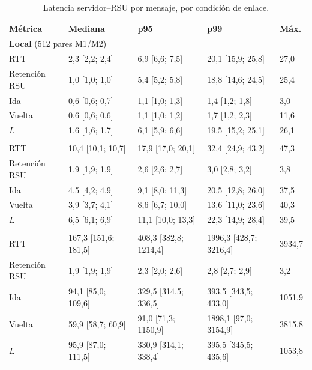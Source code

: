 \begin{table}[H]
\centering
\caption{Latencia servidor--RSU por mensaje, por condición de enlace.}
\label{tab:latencia_mensaje}
\small
\begin{tabular}{lllll}
\toprule
\textbf{Métrica} & \textbf{Mediana} & \textbf{p95} & \textbf{p99} & \textbf{Máx.} \\
\midrule
\multicolumn{5}{l}{\textbf{Local} (512 pares M1/M2)} \\
\quad RTT & 2,3 [2,2; 2,4] & 6,9 [6,6; 7,5] & 20,1 [15,9; 25,8] & 27,0 \\
\quad Retención RSU & 1,0 [1,0; 1,0] & 5,4 [5,2; 5,8] & 18,8 [14,6; 24,5] & 25,4 \\
\quad Ida & 0,6 [0,6; 0,7] & 1,1 [1,0; 1,3] & 1,4 [1,2; 1,8] & 3,0 \\
\quad Vuelta & 0,6 [0,6; 0,6] & 1,1 [1,0; 1,2] & 1,7 [1,2; 2,3] & 11,6 \\
\quad $L$ & 1,6 [1,6; 1,7] & 6,1 [5,9; 6,6] & 19,5 [15,2; 25,1] & 26,1 \\
\addlinespace
\multicolumn{5}{l}{\textbf{Wi-Fi} (526 pares M1/M2)} \\
\quad RTT & 10,4 [10,1; 10,7] & 17,9 [17,0; 20,1] & 32,4 [24,9; 43,2] & 47,3 \\
\quad Retención RSU & 1,9 [1,9; 1,9] & 2,6 [2,6; 2,7] & 3,0 [2,8; 3,2] & 3,8 \\
\quad Ida & 4,5 [4,2; 4,9] & 9,1 [8,0; 11,3] & 20,5 [12,8; 26,0] & 37,5 \\
\quad Vuelta & 3,9 [3,7; 4,1] & 8,6 [6,7; 10,0] & 13,6 [11,0; 23,6] & 40,3 \\
\quad $L$ & 6,5 [6,1; 6,9] & 11,1 [10,0; 13,3] & 22,3 [14,9; 28,4] & 39,5 \\
\addlinespace
\multicolumn{5}{l}{\textbf{4G} (423 pares M1/M2)} \\
\quad RTT & 167,3 [151,6; 181,5] & 408,3 [382,8; 1214,4] & 1996,3 [428,7; 3216,4] & 3934,7 \\
\quad Retención RSU & 1,9 [1,9; 1,9] & 2,3 [2,0; 2,6] & 2,8 [2,7; 2,9] & 3,2 \\
\quad Ida & 94,1 [85,0; 109,6] & 329,5 [314,5; 336,5] & 393,5 [343,5; 433,0] & 1051,9 \\
\quad Vuelta & 59,9 [58,7; 60,9] & 91,0 [71,3; 1150,9] & 1898,1 [97,0; 3154,9] & 3815,8 \\
\quad $L$ & 95,9 [87,0; 111,5] & 330,9 [314,1; 338,4] & 395,5 [345,5; 435,6] & 1053,8 \\
\bottomrule
\end{tabular}
\par{}
\end{table}
